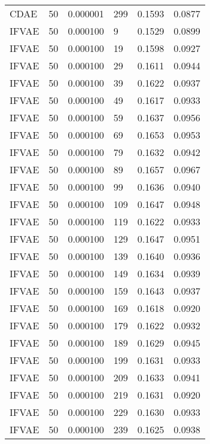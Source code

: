 \begin{tabular}{llrlrr}
    CDAE &   50 &  0.000001 &   299 &  0.1593 &       0.0877 \\
   IFVAE &   50 &  0.000100 &     9 &  0.1529 &       0.0899 \\
   IFVAE &   50 &  0.000100 &    19 &  0.1598 &       0.0927 \\
   IFVAE &   50 &  0.000100 &    29 &  0.1611 &       0.0944 \\
   IFVAE &   50 &  0.000100 &    39 &  0.1622 &       0.0937 \\
   IFVAE &   50 &  0.000100 &    49 &  0.1617 &       0.0933 \\
   IFVAE &   50 &  0.000100 &    59 &  0.1637 &       0.0956 \\
   IFVAE &   50 &  0.000100 &    69 &  0.1653 &       0.0953 \\
   IFVAE &   50 &  0.000100 &    79 &  0.1632 &       0.0942 \\
   IFVAE &   50 &  0.000100 &    89 &  0.1657 &       0.0967 \\
   IFVAE &   50 &  0.000100 &    99 &  0.1636 &       0.0940 \\
   IFVAE &   50 &  0.000100 &   109 &  0.1647 &       0.0948 \\
   IFVAE &   50 &  0.000100 &   119 &  0.1622 &       0.0933 \\
   IFVAE &   50 &  0.000100 &   129 &  0.1647 &       0.0951 \\
   IFVAE &   50 &  0.000100 &   139 &  0.1640 &       0.0936 \\
   IFVAE &   50 &  0.000100 &   149 &  0.1634 &       0.0939 \\
   IFVAE &   50 &  0.000100 &   159 &  0.1643 &       0.0937 \\
   IFVAE &   50 &  0.000100 &   169 &  0.1618 &       0.0920 \\
   IFVAE &   50 &  0.000100 &   179 &  0.1622 &       0.0932 \\
   IFVAE &   50 &  0.000100 &   189 &  0.1629 &       0.0945 \\
   IFVAE &   50 &  0.000100 &   199 &  0.1631 &       0.0933 \\
   IFVAE &   50 &  0.000100 &   209 &  0.1633 &       0.0941 \\
   IFVAE &   50 &  0.000100 &   219 &  0.1631 &       0.0920 \\
   IFVAE &   50 &  0.000100 &   229 &  0.1630 &       0.0933 \\
   IFVAE &   50 &  0.000100 &   239 &  0.1625 &       0.0938 \\

\end{tabular}
